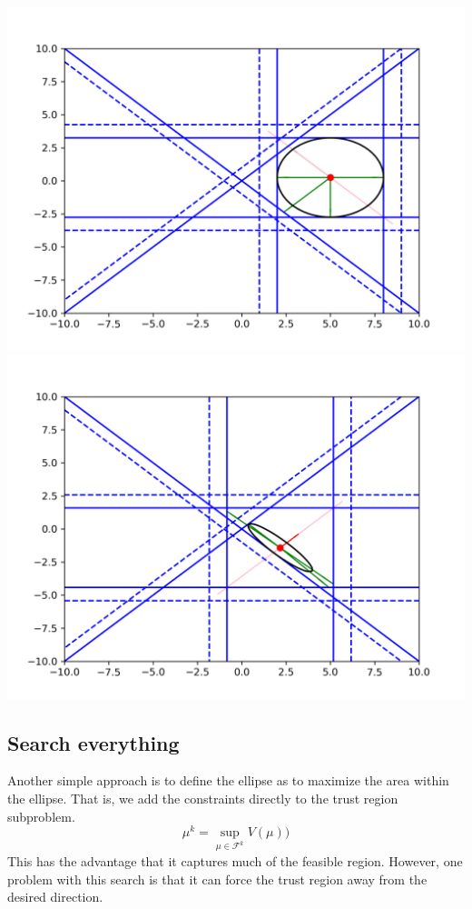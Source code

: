 \documentclass{article}
\begin{document}
\includegraphics[scale=0.4]{advantage_of_ellipse_1.png}
\includegraphics[scale=0.4]{advantage_of_ellipse_2.png}



\subsection{Search everything}
Another simple approach is to define the ellipse as to maximize the area within the ellipse.
That is, we add the constraints directly to the trust region subproblem.
$$\mu^k = \sup_{\mu \in \mathcal{F}^k} V(\mu))$$
This has the advantage that it captures much of the feasible region.
However, one problem with this search is that it can force the trust region away from the desired direction.
\end{document}
